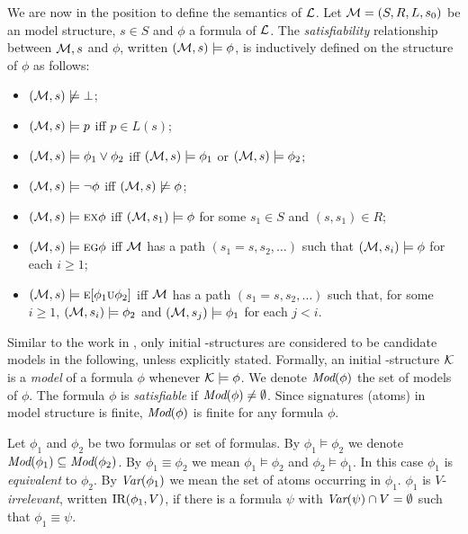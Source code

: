 \documentclass{article}
\begin{document}
We are now in the position to define the semantics of $\cal L$.
Let ${\cal M}=(S,R,L,s_0)$ be an model structure, $s\in S$ and $\phi$ a formula of $\cal L$.
The {\em satisfiability} relationship between ${\cal M},s$ and $\phi$,
written $({\cal M},s)\models\phi$, is inductively defined on the structure of $\phi$ as follows:
\begin{itemize}
  \item $({\cal M},s)\not\models\bot$;
  \item $({\cal M},s)\models p$ iff $p\in L(s)$;
  \item $({\cal M},s)\models \phi_1\lor\phi_2$ iff
    $({\cal M},s)\models \phi_1$ or $({\cal M},s)\models \phi_2$;
  \item $({\cal M},s)\models \neg\phi$ iff  $({\cal M},s)\not\models\phi$;
  \item $({\cal M},s)\models \textsc{e}\textsc{x}\phi$ iff
    $({\cal M},s_1)\models\phi$ for some $s_1\in S$ and $(s,s_1)\in R$;
  \item $({\cal M},s)\models \textsc{e}\textsc{g}\phi$ iff
    $\cal M$ has a path $(s_1=s,s_2,\ldots)$ such that
    $({\cal M},s_i)\models\phi$ for each $i\ge 1$;
  \item $({\cal M},s)\models \textsc{e}[\phi_1\textsc{u}\phi_2]$ iff
    $\cal M$ has a path $(s_1=s,s_2,\ldots)$ such that, for some $i\ge 1$,
    $({\cal M},s_i)\models\phi_2$ and
    $({\cal M},s_j)\models\phi_1$ for each $j<i$.
\end{itemize}

Similar to the work in \cite{DBLP:journals/tcs/BrowneCG88,Bolotov:1999:JETAI},
only initial \MPK-structures are considered to be candidate models
in the following, unless explicitly stated. Formally,
an initial \MPK-structure $\cal K$ is a {\em model} of a formula $\phi$
whenever ${\cal K}\models\phi$.
We denote $\textit{Mod}(\phi)$ the set of models of $\phi$.
The formula $\phi$  is {\em satisfiable}
if $\textit{Mod}(\phi)\neq\emptyset$.
Since signatures (atoms) in model structure is finite, $\textit{Mod}(\phi)$
is finite for any formula $\phi$.

Let $\phi_1$ and $\phi_2$ be two formulas or set of formulas.
By $\phi_1\models\phi_2$ we denote $\textit{Mod}(\phi_1)\subseteq\textit{Mod}(\phi_2)$.
By $\phi_1\equiv\phi_2$ we mean $\phi_1\models\phi_2$ and $\phi_2\models\phi_1$.
In this case $\phi_1$ is {\em equivalent} to $\phi_2$.
By $\textit{Var}(\phi_1)$ we mean the set of atoms occurring in $\phi_1$.
 $\phi_1$ is $V$-{\em irrelevant}, written $\textrm{IR}(\phi_1,V)$,
if there is a formula $\psi$ with
$\textit{Var}(\psi)\cap V=\emptyset$ such that $\phi_1\equiv\psi$.
\end{document}
